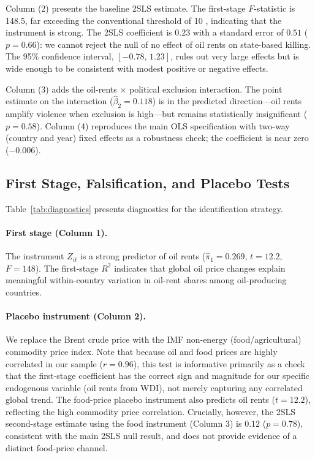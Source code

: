 \documentclass[12pt]{article}
\begin{document}
Column (2) presents the baseline 2SLS estimate.
The first-stage $F$-statistic is 148.5,
far exceeding the conventional threshold of 10 \citep{stock2002testing},
indicating that the instrument is strong.
The 2SLS coefficient is $0.23$ with a standard error of $0.51$
($p = 0.66$):
we cannot reject the null of no effect of oil rents on state-based killing.
The 95\% confidence interval, $[-0.78,\, 1.23]$,
rules out very large effects but is wide enough to be consistent with
modest positive or negative effects.

Column (3) adds the oil-rents $\times$ political exclusion interaction.
The point estimate on the interaction ($\hat{\beta}_2 = 0.118$)
is in the predicted direction---oil rents amplify violence when exclusion is
high---but remains statistically insignificant ($p = 0.58$).
Column (4) reproduces the main OLS specification with two-way (country and year)
fixed effects as a robustness check; the coefficient is near zero ($-0.006$).



\subsection{First Stage, Falsification, and Placebo Tests}

Table~\ref{tab:diagnostics} presents diagnostics for the identification strategy.

\paragraph{First stage (Column 1).}
The instrument $Z_{it}$ is a strong predictor of oil rents
($\hat{\pi}_1 = 0.269$, $t = 12.2$, $F = 148$).
The first-stage $R^2$ indicates that global oil price changes
explain meaningful within-country variation in oil-rent shares
among oil-producing countries.

\paragraph{Placebo instrument (Column 2).}
We replace the Brent crude price with the IMF non-energy (food/agricultural)
commodity price index.
Note that because oil and food prices are highly correlated in our sample
($r = 0.96$), this test is informative primarily as a check that
the first-stage coefficient has the correct sign and magnitude
for our specific endogenous variable (oil rents from WDI),
not merely capturing any correlated global trend.
The food-price placebo instrument also predicts oil rents
($t = 12.2$), reflecting the high commodity price correlation.
Crucially, however, the 2SLS second-stage estimate using the food instrument
(Column 3) is $0.12$ ($p = 0.78$),
consistent with the main 2SLS null result,
and does not provide evidence of a distinct food-price channel.
\end{document}
